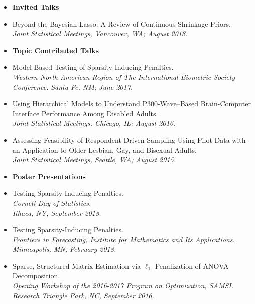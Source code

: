 \documentclass[11pt]{article}
\newcommand{\tab}{\hspace*{2em}}
\begin{document}
\begin{itemize}
	\item[] \textbf{Invited Talks} \vspace{-2mm}
	\item[] Beyond the Bayesian Lasso: A Review of Continuous Shrinkage Priors. \\
	\tab \emph{Joint Statistical Meetings, Vancouver, WA; August 2018.} \vspace{-2mm}
	\item[] \textbf{Topic Contributed Talks} \vspace{-2mm}
	\item[] Model-Based Testing of Sparsity Inducing Penalties. \\
	\tab \emph{Western North American Region of The International Biometric Society Conference.}
	\tab \emph{Santa Fe, NM; June 2017.} \vspace{-2mm}
	\item[] Using Hierarchical Models to Understand P300-Wave--Based Brain-Computer Interface Performance Among Disabled Adults. \\
	\tab \emph{Joint Statistical Meetings, Chicago, IL; August 2016.} \vspace{-2mm}
	\item[] Assessing Feasibility of Respondent-Driven Sampling Using Pilot Data with an Application to Older Lesbian, Gay, and Bisexual Adults. \\
	\tab \emph{Joint Statistical Meetings, Seattle, WA; August 2015.} 
	\item[] \textbf{Poster Presentations}\vspace{-2mm}
	\item[] Testing Sparsity-Inducing Penalties. \\
	\tab \emph{Cornell Day of Statistics.}\\ 
	\tab \emph{Ithaca, NY, September 2018.} \vspace{-2mm}
	\item[] Testing Sparsity-Inducing Penalties. \\
	\tab \emph{Frontiers in Forecasting, Institute for Mathematics and Its Applications.}\\ 
	\tab \emph{Minneapolis, MN, February 2018.} \vspace{-2mm}
	\item[] Sparse, Structured Matrix Estimation via $\ell_1$ Penalization of ANOVA Decomposition. \\
	\tab \emph{Opening Workshop of the 2016-2017 Program on Optimization, SAMSI.}\\ 
	\tab \emph{Research Triangle Park, NC, September 2016.}
\end{itemize}
\end{document}
